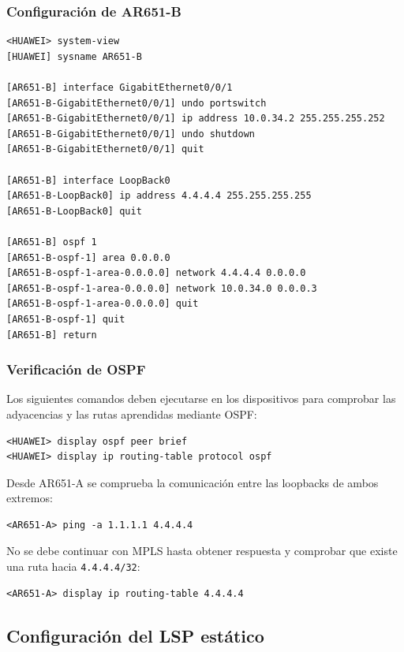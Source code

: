 \subsubsection{Configuración de AR651-B}

\begin{lstlisting}[style=terminal]
<HUAWEI> system-view
[HUAWEI] sysname AR651-B

[AR651-B] interface GigabitEthernet0/0/1
[AR651-B-GigabitEthernet0/0/1] undo portswitch
[AR651-B-GigabitEthernet0/0/1] ip address 10.0.34.2 255.255.255.252
[AR651-B-GigabitEthernet0/0/1] undo shutdown
[AR651-B-GigabitEthernet0/0/1] quit

[AR651-B] interface LoopBack0
[AR651-B-LoopBack0] ip address 4.4.4.4 255.255.255.255
[AR651-B-LoopBack0] quit

[AR651-B] ospf 1
[AR651-B-ospf-1] area 0.0.0.0
[AR651-B-ospf-1-area-0.0.0.0] network 4.4.4.4 0.0.0.0
[AR651-B-ospf-1-area-0.0.0.0] network 10.0.34.0 0.0.0.3
[AR651-B-ospf-1-area-0.0.0.0] quit
[AR651-B-ospf-1] quit
[AR651-B] return
\end{lstlisting}

\subsubsection{Verificación de OSPF}

Los siguientes comandos deben ejecutarse en los dispositivos para comprobar
las adyacencias y las rutas aprendidas mediante OSPF:

\begin{lstlisting}[style=terminal]
<HUAWEI> display ospf peer brief
<HUAWEI> display ip routing-table protocol ospf
\end{lstlisting}

Desde AR651-A se comprueba la comunicación entre las loopbacks de ambos
extremos:

\begin{lstlisting}[style=terminal]
<AR651-A> ping -a 1.1.1.1 4.4.4.4
\end{lstlisting}

No se debe continuar con MPLS hasta obtener respuesta y comprobar que existe
una ruta hacia \texttt{4.4.4.4/32}:

\begin{lstlisting}[style=terminal]
<AR651-A> display ip routing-table 4.4.4.4
\end{lstlisting}

\subsection{Configuración del LSP estático}

